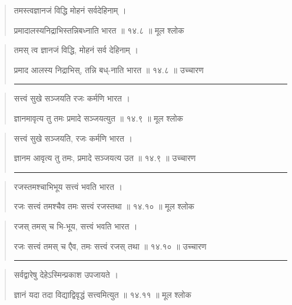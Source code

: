 \begin{quotation}

तमस्त्वज्ञानजं विद्धि मोहनं सर्वदेहिनाम्‌  ।  

प्रमादालस्यनिद्राभिस्तन्निबध्नाति भारत  ॥ १४.८ ॥  मूल श्लोक
\end{quotation}

\begin{quotation}

तमस् त्व ज्ञानजं विद्धि, मोहनं सर्व देहिनाम्‌  ।  

प्रमाद आलस्य निद्राभिस्, तन्नि बध्-नाति भारत  ॥ १४.८ ॥  उच्चारण

\noindent\rule{16cm}{0.4pt} 
\end{quotation}


\begin{quotation}

सत्त्वं सुखे सञ्जयति रजः कर्मणि भारत  ।  

ज्ञानमावृत्य तु तमः प्रमादे सञ्जयत्युत  ॥ १४.९ ॥  मूल श्लोक
\end{quotation}

\begin{quotation}

सत्त्वं सुखे सञ्जयति, रजः कर्मणि भारत  ।  

ज्ञानम आवृत्य तु तमः, प्रमादे सञ्जयत्य उत  ॥ १४.९ ॥  उच्चारण

\noindent\rule{16cm}{0.4pt} 
\end{quotation}


\begin{quotation}

रजस्तमश्चाभिभूय सत्त्वं भवति भारत  ।  

रजः सत्त्वं तमश्चैव तमः सत्त्वं रजस्तथा  ॥ १४.१० ॥  मूल श्लोक
\end{quotation}

\begin{quotation}

रजस् तमस् च भि-भूय, सत्त्वं भवति भारत  ।  

रजः सत्त्वं तमस् च एैव, तमः सत्त्वं रजस् तथा  ॥ १४.१० ॥  उच्चारण

\noindent\rule{16cm}{0.4pt} 
\end{quotation}


\begin{quotation}

सर्वद्वारेषु देहेऽस्मिन्प्रकाश उपजायते  ।  

ज्ञानं यदा तदा विद्याद्विवृद्धं सत्त्वमित्युत  ॥ १४.११ ॥  मूल श्लोक
\end{quotation}

